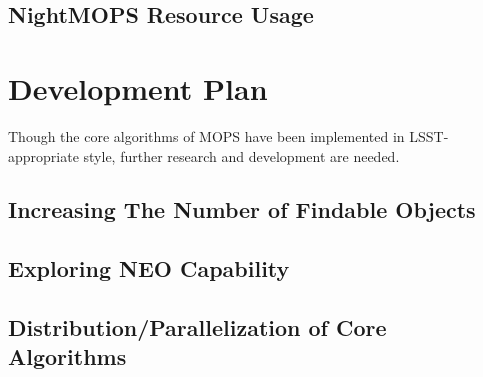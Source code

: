 \documentclass[12pt,preprint]{aastex}
\begin{document}
\subsection{NightMOPS Resource Usage}


















\section{Development Plan}

Though the core algorithms of MOPS have been implemented in
LSST-appropriate style, further research and development are needed.

\subsection{Increasing The Number of Findable Objects}

\subsection{Exploring NEO Capability}

\subsection{Distribution/Parallelization of Core Algorithms}







\end{document}
